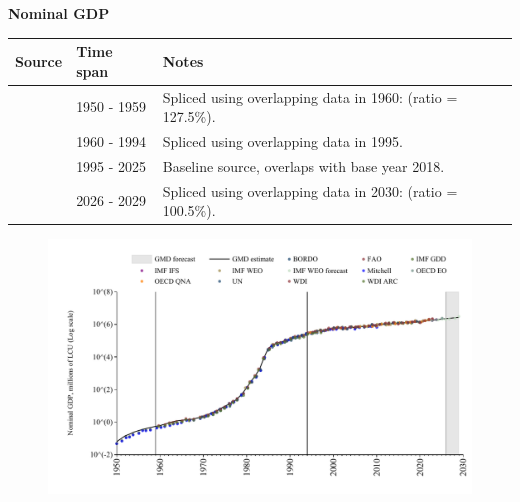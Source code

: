 \documentclass[12pt,a4paper,landscape]{article}
\begin{document}
\begin{adjustbox}{max totalsize={\paperwidth}{\paperheight},center}
\begin{minipage}[t][\textheight][t]{\textwidth}
\vspace*{0.5cm}
{}
\begin{center}
{\Large\bfseries Nominal GDP}
\end{center}
\vspace{0.5cm}
\begin{table}[H]
\centering
\small
\begin{tabular}{|l|l|l|}
\hline
\textbf{Source} & \textbf{Time span} & \textbf{Notes} \\
\hline
\rowcolor{white}\cite{IMF_GDD}& 1950 - 1959 &Spliced using overlapping data in 1960: (ratio = 127.5\%). \\
\rowcolor{lightgray}\cite{WDI}& 1960 - 1994 &Spliced using overlapping data in 1995. \\
\rowcolor{white}\cite{OECD_EO}& 1995 - 2025 &Baseline source, overlaps with base year 2018. \\
\rowcolor{lightgray}\cite{IMF_WEO_forecast}& 2026 - 2029 &Spliced using overlapping data in 2030: (ratio = 100.5\%). \\
\hline
\end{tabular}
\end{table}
\begin{figure}[H]
\centering
\includegraphics[width=\textwidth,height=0.6\textheight,keepaspectratio]{graphs/ISR_nGDP.pdf}
\end{figure}
\end{minipage}
\end{adjustbox}
\end{document}
